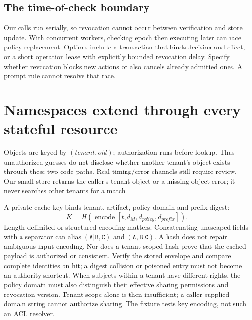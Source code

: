 \subsection{The time-of-check boundary}
Our calls run serially, so revocation cannot occur between verification and
store update. With concurrent workers, checking epoch then executing later
can race policy replacement. Options include a transaction that binds decision
and effect, or a short operation lease with explicitly bounded revocation delay.
Specify whether revocation blocks new actions or also cancels already admitted
ones. A prompt rule cannot resolve that race.

\section{Namespaces extend through every stateful resource}
\label{evod45:namespace}
Objects are keyed by $(tenant,oid)$; authorization runs before lookup. Thus
unauthorized guesses do not disclose whether another tenant's object exists
through these two code paths. Real timing/error channels still require review.
Our small store returns the caller's tenant object or a missing-object error;
it never searches other tenants for a match.

A private cache key binds tenant, artifact, policy domain and prefix digest:
\[
 K=H(\operatorname{encode}[t,d_M,d_{policy},d_{prefix}]).
\]
Length-delimited or structured encoding matters. Concatenating unescaped
fields with a separator can alias $(\texttt{A|B},\texttt{C})$ and
$(\texttt{A},\texttt{B|C})$. A hash does not repair ambiguous input encoding.
Nor does a tenant-scoped hash prove that the cached payload is authorized or
consistent. Verify the stored envelope and compare complete identities on hit;
a digest collision or poisoned entry must not become an authority shortcut.
When subjects within a tenant have different rights, the policy domain must
also distinguish their effective sharing permissions and revocation version.
Tenant scope alone is then insufficient; a caller-supplied domain string cannot
authorize sharing. The fixture tests key encoding, not such an ACL resolver.


